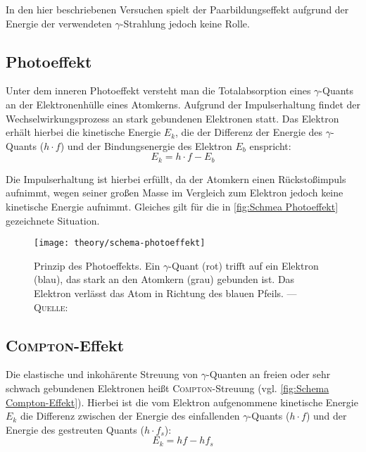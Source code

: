\documentclass[../protokoll.tex]{subfiles}
\begin{document}
In den hier beschriebenen Versuchen spielt der Paarbildungseffekt aufgrund der
Energie der verwendeten $\gamma$-Strahlung jedoch keine Rolle.

\subsection{Photoeffekt}
Unter dem inneren Photoeffekt versteht man die Totalabsorption eines
$\gamma$-Quants an der Elektronenhülle eines Atomkerns. Aufgrund der 
Impulserhaltung findet der Wechselwirkungsprozess an stark gebundenen Elektronen
statt. Das Elektron erhält hierbei die kinetische Energie $E_k$, die der
Differenz der Energie des $\gamma$-Quants ($h \cdot f$) und der Bindungsenergie
des Elektron $E_b$ enspricht:
\begin{equation}\label{eq:Kinetische Energie Photoeffekt}
    E_k = h \cdot f - E_b
\end{equation}

Die Impulserhaltung ist hierbei erfüllt, da der Atomkern einen Rückstoßimpuls
aufnimmt, wegen seiner großen Masse im Vergleich zum Elektron jedoch keine
kinetische Energie aufnimmt. Gleiches gilt für die in 
\cref{fig:Schmea Photoeffekt} gezeichnete Situation.

\begin{figure}[H]
    \centering
    \texttt{[image: theory/schema-photoeffekt]}
    \caption{Prinzip des Photoeffekts. Ein $\gamma$-Quant (rot) trifft auf ein 
    Elektron (blau), das stark an den Atomkern (grau) gebunden ist. Das Elektron
     verlässt das Atom in Richtung des blauen Pfeils. --- 
     \textsc{Quelle}: \cite[S.32, Abb. 3]{script}}
    \label{fig:Schema Photoeffekt}
\end{figure}

\subsection{\textsc{Compton}-Effekt}
Die elastische und inkohärente Streuung von $\gamma$-Quanten an freien oder sehr
schwach gebundenen Elektronen heißt \textsc{Compton}-Streuung 
(vgl. \cref{fig:Schema Compton-Effekt}). Hierbei ist die vom Elektron
aufgenommene kinetische Energie $E_k$ die Differenz zwischen der Energie des
einfallenden $\gamma$-Quants ($h \cdot f$) und der Energie des gestreuten
Quants ($h \cdot f_s$):
\begin{equation}\label{eq:Kinetische Energie Compton}
    E_k = hf - hf_s
\end{equation}
\end{document}
